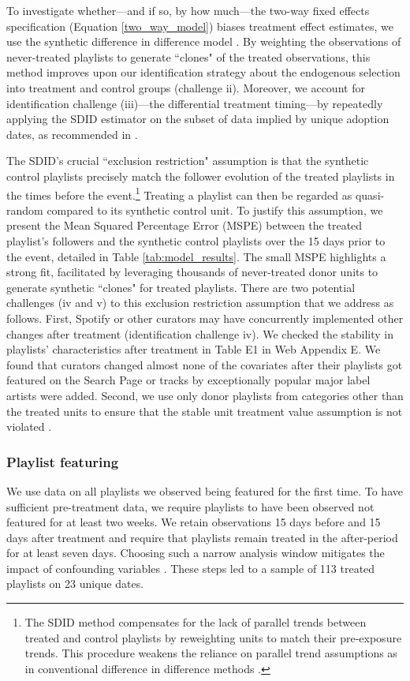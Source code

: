 \documentclass[12pt, a4paper, leqno]{article}
\begin{document}
To investigate whether---and if so, by how much---the two-way fixed effects specification (Equation \ref{two_way_model}) biases treatment effect estimates, we use the synthetic difference in difference model \citep{SDiD_AER_Arkhangelsky_21}. By weighting the observations of never-treated playlists to generate ``clones" of the treated observations, this method improves upon our identification strategy about the endogenous selection into treatment and control groups (challenge ii). Moreover, we account for identification challenge (iii)---the differential treatment timing---by repeatedly applying the SDID estimator on the subset of data implied by unique adoption dates, as recommended in \cite{SDiD_AER_Arkhangelsky_21}.

The SDID's crucial ``exclusion restriction" assumption is that the synthetic control playlists precisely match the follower evolution of the treated playlists in the times before the event.\footnote{The SDID method compensates for the lack of parallel trends between treated and control playlists by reweighting units to match their pre-exposure trends. This procedure weakens the reliance on parallel trend assumptions as in conventional difference in difference methods \citep{SDiD_AER_Arkhangelsky_21}.} Treating a playlist can then be regarded as quasi-random compared to its synthetic control unit. To justify this assumption, we present the Mean Squared Percentage Error (MSPE) between the treated playlist's followers and the synthetic control playlists over the 15 days prior to the event, detailed in Table \ref{tab:model_results}. The small MSPE highlights a strong fit, facilitated by leveraging thousands of never-treated donor units to generate synthetic ``clones" for treated playlists. There are two potential challenges (iv and v) to this exclusion restriction assumption that we address as follows. First, Spotify or other curators may have concurrently implemented other changes after treatment (identification challenge iv). We checked the stability in playlists' characteristics after treatment in Table E1 in Web Appendix E. We found that curators changed almost none of the covariates after their playlists got featured on the Search Page or tracks by exceptionally popular major label artists were added. Second, we use only donor playlists from categories other than the treated units to ensure that the stable unit treatment value assumption is not violated \citep[][]{goldfarb2022conducting}.   

\subsubsection{Playlist featuring} 
We use data on all playlists we observed being featured for the first time. To have sufficient pre-treatment data, we require playlists to have been observed not featured for at least two weeks. We retain observations 15 days before and 15 days after treatment and require that playlists remain treated in the after-period for at least seven days. Choosing such a narrow analysis window mitigates the impact of confounding variables \citep[e.g.,][]{orhun_16}. These steps led to a sample of 113 treated playlists on 23 unique dates. 
\end{document}
